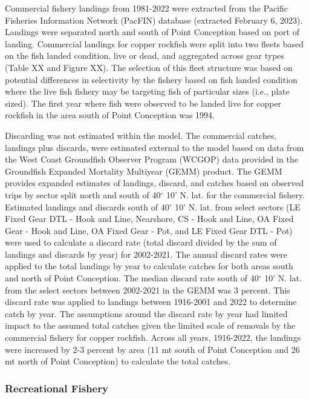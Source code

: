 \documentclass[
]{article}
\begin{document}
Commercial fishery landings from 1981-2022 were extracted from the
Pacific Fisheries Information Network (PacFIN) database (extracted
February 6, 2023). Landings were separated north and south of Point
Conception based on port of landing. Commercial landings for copper
rockfish were split into two fleets based on the fish landed condition,
live or dead, and aggregated across gear types (Table XX and Figure XX).
The selection of this fleet structure was based on potential differences
in selectivity by the fishery based on fish landed condition where the
live fish fishery may be targeting fish of particular sizes (i.e., plate
sized). The first year where fish were observed to be landed live for
copper rockfish in the area south of Point Conception was 1994.

Discarding was not estimated within the model. The commercial catches,
landings plus discards, were estimated external to the model based on
data from the West Coast Groundfish Observer Program (WCGOP) data
provided in the Groundfish Expanded Mortality Multiyear (GEMM) product.
The GEMM provides expanded estimates of landings, discard, and catches
based on observed trips by sector split north and south of 40\(^\circ\)
10' N. lat. for the commercial fishery. Estimated landings and discards
south of 40\(^\circ\) 10' N. lat. from select sectors (LE Fixed Gear DTL
- Hook and Line, Nearshore, CS - Hook and Line, OA Fixed Gear - Hook and
Line, OA Fixed Gear - Pot, and LE Fixed Gear DTL - Pot) were used to
calculate a discard rate (total discard divided by the sum of landings
and discards by year) for 2002-2021. The annual discard rates were
applied to the total landings by year to calculate catches for both
areas south and north of Point Conception. The median discard rate south
of 40\(^\circ\) 10' N. lat. from the select sectors between 2002-2021 in
the GEMM was 3 percent. This discard rate was applied to landings
between 1916-2001 and 2022 to determine catch by year. The assumptions
around the discard rate by year had limited impact to the assumed total
catches given the limited scale of removals by the commercial fishery
for copper rockfish. Across all years, 1916-2022, the landings were
increased by 2-3 percent by area (11 mt south of Point Conception and 26
mt north of Point Conception) to calculate the total catches.

\hypertarget{recreational-fishery}{%
\subsubsection{Recreational Fishery}\label{recreational-fishery}}
\end{document}

